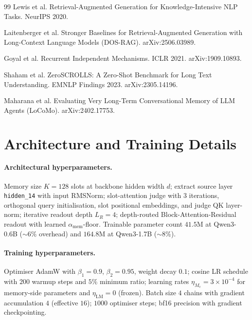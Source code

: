 \documentclass{article}
\newcommand{\Mc}{M_{\mathrm{c}}}
\newcommand{\amem}{\alpha_{\mathrm{mem}}}
\begin{document}
\begin{thebibliography}{99}
Lewis et al.
\newblock Retrieval-Augmented Generation for Knowledge-Intensive NLP Tasks.
\newblock NeurIPS 2020.

Laitenberger et al.
\newblock Stronger Baselines for Retrieval-Augmented Generation with Long-Context Language Models (DOS-RAG).
\newblock arXiv:2506.03989.

Goyal et al.
\newblock Recurrent Independent Mechanisms.
\newblock ICLR 2021. arXiv:1909.10893.

Shaham et al.
\newblock ZeroSCROLLS: A Zero-Shot Benchmark for Long Text Understanding.
\newblock EMNLP Findings 2023. arXiv:2305.14196.

Maharana et al.
\newblock Evaluating Very Long-Term Conversational Memory of LLM Agents (LoCoMo).
\newblock arXiv:2402.17753.

\end{thebibliography}



\appendix

\section{Architecture and Training Details}
\label{app:arch}

\paragraph{Architectural hyperparameters.}  Memory size $K=128$ slots
at backbone hidden width $d$; extract source layer
\texttt{hidden\_14} with input RMSNorm; slot-attention judge with
$3$ iterations, orthogonal query initialisation, slot positional
embeddings, and judge QK layer-norm; iterative readout depth
$L_R=4$; depth-routed Block-Attention-Residual readout with learned
$\amem$-floor.  Trainable parameter count $41.5$M at Qwen3-0.6B
($\sim\!6\%$ overhead) and $164.8$M at Qwen3-1.7B ($\sim\!8\%$).

\paragraph{Training hyperparameters.}  Optimiser AdamW with
$\beta_1{=}0.9$, $\beta_2{=}0.95$, weight decay $0.1$; cosine LR
schedule with $200$ warmup steps and $5\%$ minimum ratio; learning
rates $\eta_{\Mc} = 3{\times}10^{-4}$ for memory-side parameters and
$\eta_{\mathrm{LM}} = 0$ (frozen).  Batch size $4$ chains with
gradient accumulation $4$ (effective $16$); $1000$ optimiser steps;
bf16 precision with gradient checkpointing.
\end{document}
